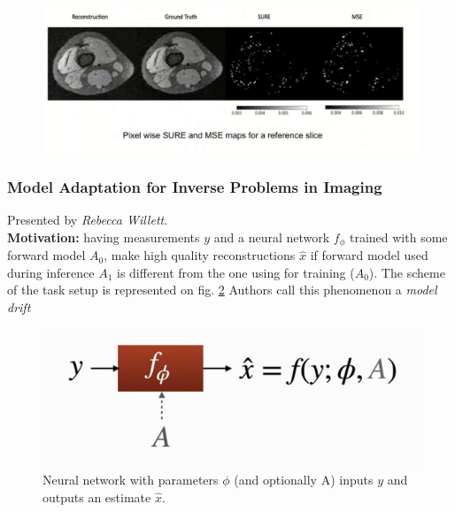 \begin{figure}[h!]
    \centering
    \includegraphics[scale=0.4]{neurips-2020/images/Screenshot 2020-12-12 at 17.26.28.png}
    \label{fig:sure-result}
\end{figure}





\subsubsection{Model Adaptation for Inverse Problems in Imaging \cite{gilton2020model}}

Presented by \textit{Rebecca Willett}. \\

{\bf Motivation:} having measurements $y$ and a neural network $f_{\phi}$ trained with some forward model $A_0$, make high quality reconstructions $\hat{x}$ if forward model used during inference $A_1$ is different from the one using for training ($A_0$). 
The scheme of the task setup is represented on fig. \ref{fig:inv_prob_setup}
Authors call this phenomenon a \textit{model drift}

\begin{figure}[h!]
    \centering
    \includegraphics[scale=0.3]{neurips-2020/images/Screenshot 2020-12-13 at 20.44.08.png}
    \caption{Neural network with parameters $\phi$ (and optionally A) inputs $y$ and outputs an estimate $\hat{x}$.}
    \label{fig:inv_prob_setup}
\end{figure} \\

